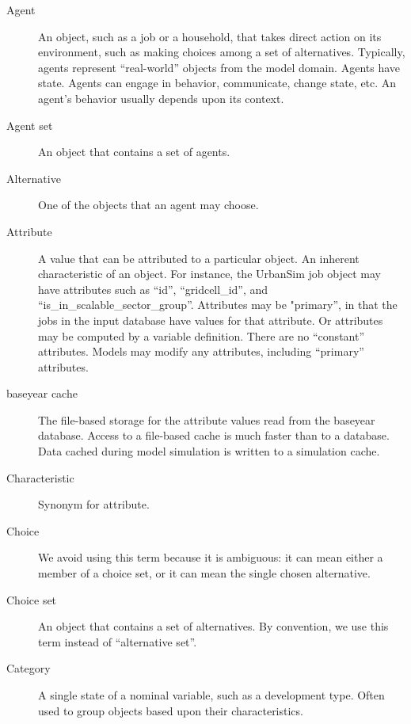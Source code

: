 \begin{description}

\item[Agent] 
An object, such as a job or a household, that takes direct action 
on its environment, such as making choices among a set of alternatives.  
Typically, agents represent ``real-world'' objects from the model
domain.  Agents have state. 
Agents can engage in behavior, communicate, change state, etc. 
An agent's behavior usually depends upon its context.  

\item[Agent set] 
An object that contains a set of agents.

\item[Alternative] 
One of the objects that an agent may choose.

\item[Attribute]
A value that can be attributed to a particular object.  An
inherent characteristic of an object.  For instance, the UrbanSim
job object may have attributes such as ``id'', ``gridcell_id'', 
and ``is_in_scalable_sector_group''.  Attributes may be 
"primary'', in that the jobs in the input database 
have values for that attribute.  Or attributes may be computed
by a variable definition.  There are no ``constant'' attributes. 
Models may modify any attributes, including ``primary'' attributes.

\item[baseyear cache]
The file-based storage for the attribute values read from the baseyear
database.  Access to a file-based cache is much faster than to a database. 
Data cached during model simulation is written to a simulation cache. 

\item[Characteristic] 
Synonym for attribute. 

\item[Choice] 
We avoid using this term because it is ambiguous: it can mean either
a member of a choice set, or it can mean the single chosen
alternative.

\item[Choice set] 
An object that contains a set of alternatives.  By convention, we use
this term instead of ``alternative set''.

\item[Category] 
A single state of a nominal variable, such as a development type.
Often used to group objects based upon their characteristics. 


\end{description}
